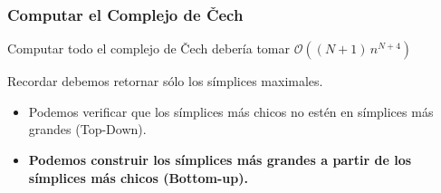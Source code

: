 \documentclass{beamer}
\makeatletter
\DeclarePairedDelimiter{\norm}{\|}{\|}
\let\oldnorm\norm
\def\norm{\@ifstar{\oldnorm}{\oldnorm*}}
\newcommand{\OO}{\mathcal{O}}
\DeclareMathOperator{\centre}{center}
\DeclareMathOperator{\aff}{aff}
\DeclareMathOperator{\card}{card}
\makeatother
\begin{document}
%

\begin{frame}\frametitle{Computar el Complejo de \v{C}ech}
  Computar todo el complejo de \v{C}ech debería tomar \(\OO( (N+1)\, n^{N+4})\)

  \pause
  Recordar debemos retornar sólo los símplices maximales.
  \begin{itemize}
    \item Podemos verificar que los símplices más chicos no estén en símplices más grandes (Top-Down).
    \item {\bfseries Podemos construir los símplices más grandes a partir de los símplices más chicos (Bottom-up).}
  \end{itemize}
\end{frame}
\end{document}

